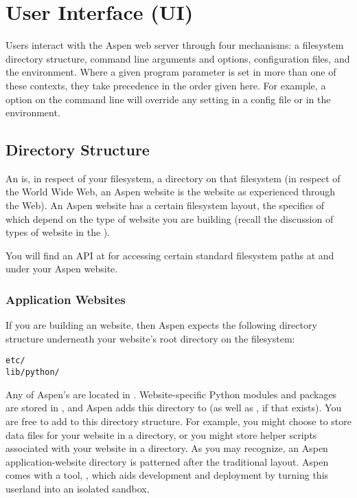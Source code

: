 \chapter{User Interface (UI) \label{interface}}

Users interact with the Aspen web server through four mechanisms: a filesystem
directory structure, command line arguments and options, configuration files,
and the environment. Where a given program parameter is set in more than one of
these contexts, they take precedence in the order given here. For example, a
 option on the command line will override any  setting in a
config file or in the environment.


\section{Directory Structure \label{directory-structure}}

An  is, in respect of your filesystem, a directory on that
filesystem (in respect of the World Wide Web, an Aspen website is the website as
experienced through the Web). An Aspen website has a certain filesystem layout,
the specifics of which depend on the type of website you are building (recall
the discussion of types of website in the
).

You will find an API at  for accessing
certain standard filesystem paths at and under your Aspen website.


\subsection{Application Websites} \label{directories-application}

If you are building an  website, then Aspen expects the
following directory structure underneath your website's root directory on the
filesystem:

\begin{verbatim}
etc/
lib/python/
\end{verbatim}

Any of Aspen's  are located in
. Website-specific Python modules and packages are stored in
, and Aspen adds this directory to  (as well as
, if that exists). You are free to add to this
directory structure. For example, you might choose to store data files for your
website in a  directory, or you might store helper scripts associated
with your website in a  directory. As you may recognize, an Aspen
application-website directory is patterned after the traditional \UNIX{} layout.
Aspen comes with a tool, , which
aids development and deployment by turning this userland into an isolated
sandbox.

